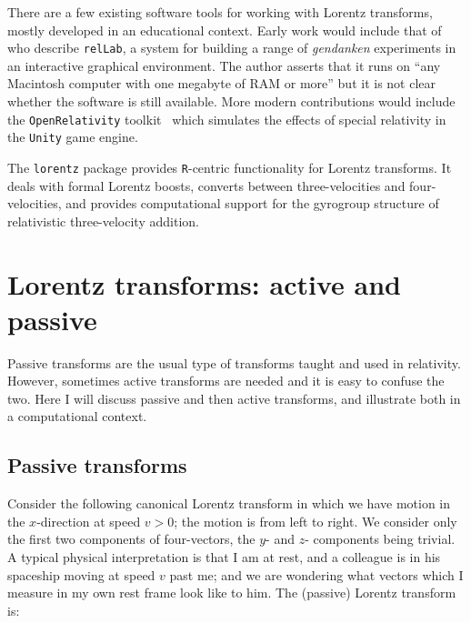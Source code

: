 \documentclass[ijoc,nonblindrev]{informs3} %
\begin{document}
There are a few existing software tools for working with Lorentz
transforms, mostly developed in an educational context.  Early work
would include that of \citet{horwitz1992} who describe {\tt relLab}, a
system for building a range of {\em gendanken} experiments in an
interactive graphical environment.  The author asserts that it runs on
``any Macintosh computer with one megabyte of RAM or more'' but it is
not clear whether the software is still available.  More modern
contributions would include the {\tt OpenRelativity}
toolkit~\citep{sherin2016} which simulates the effects of special
relativity in the {\tt Unity} game engine.

The {\tt lorentz} package provides {\tt R}-centric functionality for
Lorentz transforms.  It deals with formal Lorentz boosts, converts
between three-velocities and four-velocities, and provides
computational support for the gyrogroup structure of relativistic
three-velocity addition.



\section{Lorentz transforms: active and passive}

Passive transforms are the usual type of transforms taught and used in
relativity.  However, sometimes active transforms are needed and it is
easy to confuse the two.  Here I will discuss passive and then active
transforms, and illustrate both in a computational context.

\subsection*{Passive transforms}

\newcommand{\vvec}[2]{\begin{pmatrix}#1 \\ #2\end{pmatrix}}
\newcommand{\twomat}[4]{\begin{pmatrix} #1 & #2 \\ #3 &
    #4\end{pmatrix}}

Consider the following canonical Lorentz transform in which we have
motion in the $x$-direction at speed $v>0$; the motion is from left to
right.  We consider only the first two components of four-vectors, the
$y$- and $z$- components being trivial.  A typical physical
interpretation is that I am at rest, and a colleague is in his
spaceship moving at speed $v$ past me; and we are wondering what
vectors which I measure in my own rest frame look like to him.  The
(passive) Lorentz transform is:
\end{document}
